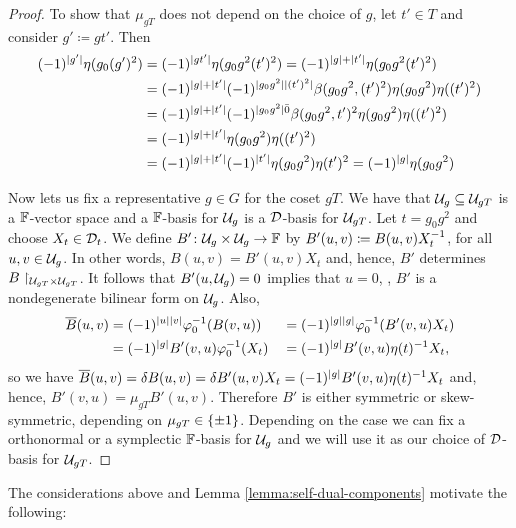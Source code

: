 \begin{proof}
    To show that $\mu_{gT}$ does not depend on the choice of $g$, let $t' \in T$ and consider $g' \coloneqq gt'$. 
    Then 
    \begin{align*}
        (-1)^{|g'|} \eta(g_0 (g')^2) &= (-1)^{|gt'|} \eta(g_0 g^2 (t')^2) = (-1)^{|g| + |t'|} \eta(g_0 g^2 (t')^2) \\
        &= (-1)^{|g| + |t'|} (-1)^{|g_0 g^2||(t')^2|} \beta(g_0 g^2, (t')^2)\eta(g_0 g^2) \eta((t')^2)\\
        &= (-1)^{|g| + |t'|} (-1)^{|g_0 g^2| \bar{0} } \beta(g_0 g^2, t')^2 \eta(g_0 g^2) \eta((t')^2) \\
        &= (-1)^{|g| + |t'|} \eta(g_0 g^2) \eta((t')^2) \\ 
        &= (-1)^{|g| + |t'|} (-1)^{|t'|} \eta(g_0 g^2) \eta(t')^2 = (-1)^{|g|} \eta(g_0 g^2)
    \end{align*}

    Now lets us fix a representative $g\in G$ for the coset $gT$. 
    We have that $\mathcal U_g \subseteq \mathcal U_{gT}$ is a $\mathbb{F}$-vector space and a $\mathbb{F}$-basis for $\mathcal U_g$ is a $\mathcal{D}$-basis for $\mathcal U_{gT}$. 
    Let $t=g_0 g^2$ and choose $X_t \in \mathcal{D}_t$. 
    We define $B'\colon \mathcal U_g \times \mathcal U_g \to \mathbb{F}$ by $B'(u,v) \coloneqq B(u,v) X_t^{-1}$, for all $u, v \in \mathcal U_g$. 
    In other words, $B(u,v) = B'(u,v) X_t$ and, hence, $B'$ determines $B\restriction_{\mathcal U_{gT} \times \mathcal U_{gT}}$. 
    It follows that $B'(u, \mathcal U_g) = 0$ implies that $u=0$, \ie, $B'$ is a nondegenerate bilinear form on $\mathcal U_g$. 
    Also, 
    \begin{alignat*}{3}
        \overline{B} (u, v) &= (-1)^{|u||v|} \varphi_0^{-1}( B(v, u) )
        &&= (-1)^{|g||g|} \varphi_0^{-1}( B'(v, u)X_t )\\
        &= (-1)^{|g|} B'(v, u) \varphi_0^{-1}(X_t)
        &&= (-1)^{|g|} B'(v, u) \eta(t)^{-1} X_t,
    \end{alignat*}
    so we have $\overline{B} (u, v) = \delta B (u, v) = \delta B' (u,v) X_t = (-1)^{|g|} B'(v, u) \eta(t)^{-1} X_t$ and, hence, $B'(v, u) = \mu_{gT} B'(u,v)$. 
    Therefore $B'$ is either symmetric or skew-symmetric, depending on $\mu_{gT} \in \{ \pm 1 \}$.
    Depending on the case we can fix a orthonormal or a symplectic $\mathbb{F}$-basis for $\mathcal U_g$ and we will use it as our choice of $\mathcal{D}$-basis for $\mathcal U_{gT}$. 
\end{proof}

The considerations above and Lemma \ref{lemma:self-dual-components} motivate the following:

